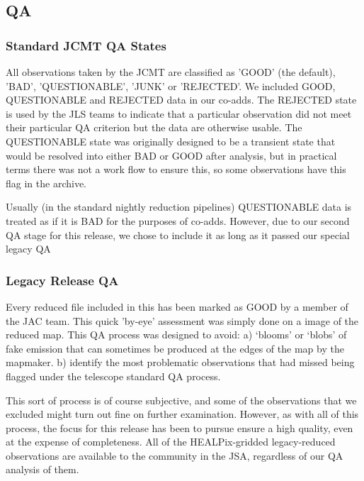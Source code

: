 \documentclass[usenatbib]{mn2e}
\begin{document}
\subsection{QA}

\subsubsection{Standard JCMT QA States}
All observations taken by the JCMT are classified as 'GOOD' (the
default), 'BAD', 'QUESTIONABLE', 'JUNK' or 'REJECTED'. We included
GOOD, QUESTIONABLE and REJECTED data in our co-adds. The REJECTED
state is used by the JLS teams to indicate that a particular
observation did not meet their particular QA criterion but the data
are otherwise usable. The QUESTIONABLE
state was originally designed to be a transient state that would be
resolved into either BAD or GOOD after analysis, but in practical
terms there was not a work flow to ensure this, so some observations
have this flag in the archive.

Usually (in the standard nightly reduction pipelines) QUESTIONABLE
data is treated as if it is BAD for the purposes of co-adds. However,
due to our second QA stage for this release, we chose to include it as
long as it passed our special legacy QA

\subsubsection{Legacy Release QA}

Every reduced file included in this has been marked as GOOD by a
member of the JAC team. This quick 'by-eye' assessment was simply done
on a image of the reduced map. This QA process was designed to avoid:
a) `blooms' or `blobs' of fake emission that can sometimes be produced
at the edges of the map by the mapmaker.  b) identify the most
problematic observations that had missed being flagged under the
telescope standard QA process.

This sort of process is of course subjective, and some of the
observations that we excluded might turn out fine on further
examination. However, as with all of this process, the focus for this
release has been to pursue ensure a high quality, even at the expense
of completeness. All of the HEALPix-gridded legacy-reduced
observations are available to the community in the JSA, regardless of
our QA analysis of them.
\end{document}
